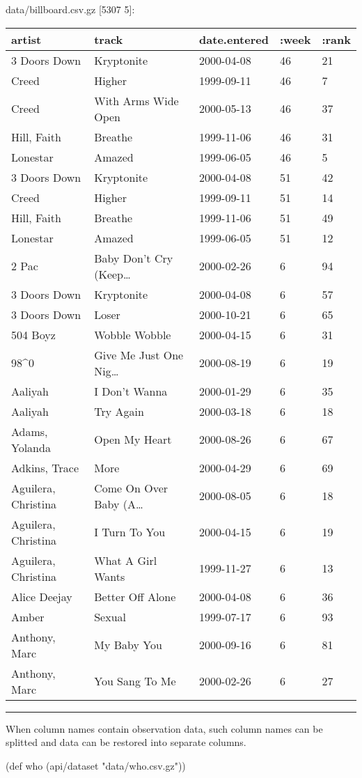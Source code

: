 \documentclass[]{article}
\newenvironment{Shaded}{\begin{snugshade}}{\end{snugshade}}
\newcommand{\StringTok}[1]{\textcolor[rgb]{0.31,0.60,0.02}{#1}}
\newcommand{\FunctionTok}[1]{\textcolor[rgb]{0.00,0.00,0.00}{#1}}
\newcommand{\BuiltInTok}[1]{#1}
\newcommand{\NormalTok}[1]{#1}
\begin{document}
data/billboard.csv.gz {[}5307 5{]}:

\begin{longtable}[]{@{}lllll@{}}
\toprule
artist & track & date.entered & :week & :rank\tabularnewline
\midrule
\endhead
3 Doors Down & Kryptonite & 2000-04-08 & 46 & 21\tabularnewline
Creed & Higher & 1999-09-11 & 46 & 7\tabularnewline
Creed & With Arms Wide Open & 2000-05-13 & 46 & 37\tabularnewline
Hill, Faith & Breathe & 1999-11-06 & 46 & 31\tabularnewline
Lonestar & Amazed & 1999-06-05 & 46 & 5\tabularnewline
3 Doors Down & Kryptonite & 2000-04-08 & 51 & 42\tabularnewline
Creed & Higher & 1999-09-11 & 51 & 14\tabularnewline
Hill, Faith & Breathe & 1999-11-06 & 51 & 49\tabularnewline
Lonestar & Amazed & 1999-06-05 & 51 & 12\tabularnewline
2 Pac & Baby Don't Cry (Keep\ldots{} & 2000-02-26 & 6 &
94\tabularnewline
3 Doors Down & Kryptonite & 2000-04-08 & 6 & 57\tabularnewline
3 Doors Down & Loser & 2000-10-21 & 6 & 65\tabularnewline
504 Boyz & Wobble Wobble & 2000-04-15 & 6 & 31\tabularnewline
98\^{}0 & Give Me Just One Nig\ldots{} & 2000-08-19 & 6 &
19\tabularnewline
Aaliyah & I Don't Wanna & 2000-01-29 & 6 & 35\tabularnewline
Aaliyah & Try Again & 2000-03-18 & 6 & 18\tabularnewline
Adams, Yolanda & Open My Heart & 2000-08-26 & 6 & 67\tabularnewline
Adkins, Trace & More & 2000-04-29 & 6 & 69\tabularnewline
Aguilera, Christina & Come On Over Baby (A\ldots{} & 2000-08-05 & 6 &
18\tabularnewline
Aguilera, Christina & I Turn To You & 2000-04-15 & 6 & 19\tabularnewline
Aguilera, Christina & What A Girl Wants & 1999-11-27 & 6 &
13\tabularnewline
Alice Deejay & Better Off Alone & 2000-04-08 & 6 & 36\tabularnewline
Amber & Sexual & 1999-07-17 & 6 & 93\tabularnewline
Anthony, Marc & My Baby You & 2000-09-16 & 6 & 81\tabularnewline
Anthony, Marc & You Sang To Me & 2000-02-26 & 6 & 27\tabularnewline
\bottomrule
\end{longtable}

\begin{center}\rule{0.5\linewidth}{0.5pt}\end{center}

When column names contain observation data, such column names can be
splitted and data can be restored into separate columns.

\begin{Shaded}
\begin{Highlighting}[]
\NormalTok{(}\BuiltInTok{def}\FunctionTok{ who }\NormalTok{(api/dataset }\StringTok{"data/who.csv.gz"}\NormalTok{))}
\end{Highlighting}
\end{Shaded}
\end{document}
